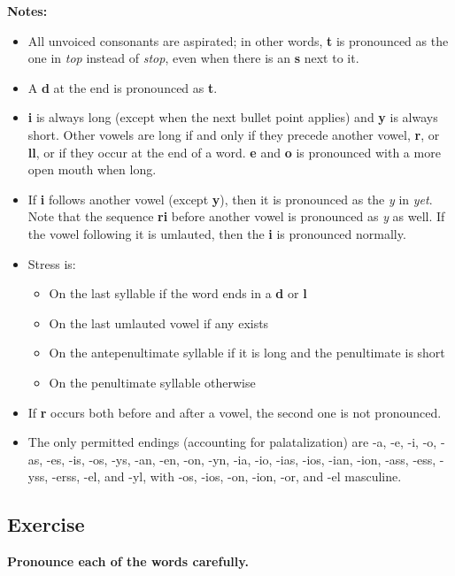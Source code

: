 \textbf{Notes:}

\begin{itemize}
  \item All unvoiced consonants are aspirated; in other words, \textbf{t} is pronounced as the one in \emph{top} instead of \emph{stop}, even when there is an \textbf{s} next to it.
  \item A \textbf{d} at the end is pronounced as \textbf{t}.
  \item \textbf{i} is always long (except when the next bullet point applies) and \textbf{y} is always short. Other vowels are long if and only if they precede another vowel, \textbf{r}, or \textbf{ll}, or if they occur at the end of a word. \textbf{e} and \textbf{o} is pronounced with a more open mouth when long.
  \item If \textbf{i} follows another vowel (except \textbf{y}), then it is pronounced as the \emph{y} in \emph{yet}. Note that the sequence \textbf{ri} before another vowel is pronounced as \emph{y} as well. If the vowel following it is umlauted, then the \textbf{i} is pronounced normally.
  \item Stress is:
  \begin{itemize}
    \item On the last syllable if the word ends in a \textbf{d} or \textbf{l}
    \item On the last umlauted vowel if any exists
    \item On the antepenultimate syllable if it is long and the penultimate is short
    \item On the penultimate syllable otherwise
  \end{itemize}
  \item If \textbf{r} occurs both before and after a vowel, the second one is not pronounced.
  \item The only permitted endings (accounting for palatalization) are -a, -e, -i, -o, -as, -es, -is, -os, -ys, -an, -en, -on, -yn, -ia, -io, -ias, -ios, -ian, -ion, -ass, -ess, -yss, -erss, -el, and -yl, with -os, -ios, -on, -ion, -or, and -el masculine.
\end{itemize}

\subsection{Exercise}

\textbf{Pronounce each of the words carefully.}

